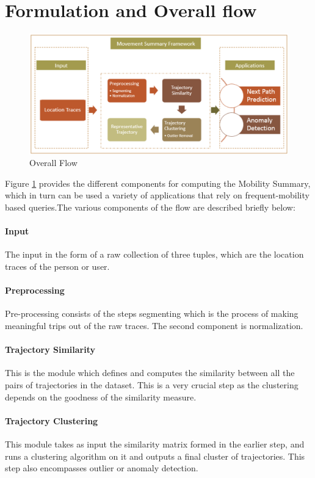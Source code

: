\section{Formulation and Overall flow}
\begin{figure}[!htb]
\centering
\includegraphics[scale=0.6]{figs/overallflow.eps}
\caption{Overall Flow}
\label{fig:components}
\end{figure}

Figure \ref{fig:components} provides the different components for computing the Mobility Summary, which in turn can be used a variety of applications that rely on frequent-mobility based queries.The various components of the flow are described briefly below: 

\paragraph{Input}
The input in the form of a raw collection of three tuples, which are the location traces of the person or user.
\paragraph{Preprocessing}
Pre-processing consists of the steps segmenting which is the process of making meaningful trips out of the raw traces. The second component is normalization.
\paragraph{Trajectory Similarity} 
This is the module which defines and computes the similarity between all the pairs of trajectories in the dataset. This is a very crucial step as the clustering depends on the goodness of the similarity measure.
\paragraph{Trajectory Clustering}
This module takes as input the similarity matrix formed in the earlier step, and runs a clustering algorithm on it and outputs a final cluster of trajectories. This step also encompasses outlier or anomaly detection.
